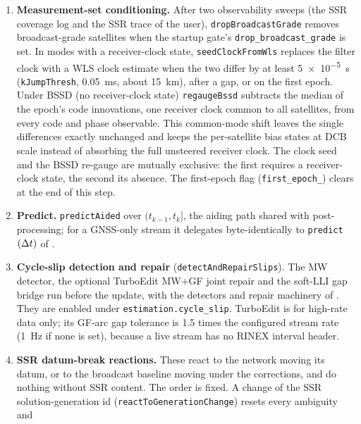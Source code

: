 \documentclass[main.tex]{subfiles}
\begin{document}
\begin{enumerate}[leftmargin=*, itemsep=0pt]
      cold-starting on metre-grade broadcast clocks.
\item \textbf{Measurement-set conditioning.}  After two observability
      sweeps (the SSR coverage log and the SSR trace of the user),
      \texttt{dropBroadcastGrade} removes broadcast-grade satellites
      when the startup gate's \texttt{drop\_broadcast\_grade} is set.  In
      modes with a receiver-clock state, \texttt{seedClockFromWls}
      replaces the filter clock with a WLS clock estimate when the two
      differ by at least \SI{5e-5}{\second} (\texttt{kJumpThresh},
      \SI{0.05}{\milli\second}, about \SI{15}{\kilo\metre}), after a
      gap, or on the first epoch.  Under BSSD (no receiver-clock state)
      \texttt{regaugeBssd} subtracts the
      median of the epoch's code innovations, one receiver clock common
      to all satellites, from every code and phase observable.  This
      common-mode shift leaves the single differences
      exactly unchanged and keeps the per-satellite bias states at DCB
      scale instead of absorbing the full unsteered receiver clock.  The
      clock seed and the BSSD re-gauge are mutually exclusive: the first
      requires a receiver-clock state, the second its absence.  The
      first-epoch flag (\texttt{first\_epoch\_}) clears at the end of
      this step.
\item \textbf{Predict.}  \texttt{predictAided} over $(t_{k-1}, t_k]$,
      the aiding path shared with post-processing; for a GNSS-only
      stream it delegates byte-identically to \texttt{predict}$(\Delta t)$ of
      .
\item \textbf{Cycle-slip detection and repair}
      (\texttt{detectAndRepairSlips}).  The MW detector, the
      optional TurboEdit MW$+$GF joint repair and the soft-LLI gap
      bridge run before the update, with the detectors and repair
      machinery of .  They are
      enabled under \texttt{estimation.cycle\_slip}.  TurboEdit is for
      high-rate data only; its GF-arc gap tolerance is 1.5 times the
      configured stream rate (\SI{1}{\hertz} if none is set), because a
      live stream has no RINEX interval header.
\item \textbf{SSR datum-break reactions.}  These react to the network
      moving its datum, or to the broadcast baseline moving under the
      corrections, and do nothing without SSR content.  The order is
      fixed.  A change of the SSR solution-generation id
      (\texttt{reactToGenerationChange}) resets every ambiguity and

\end{enumerate}
\end{document}
